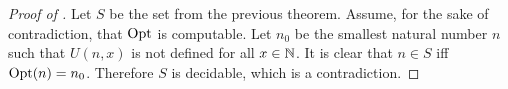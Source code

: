 \begin{proof}[Proof of ]
  Let $S$ be the set from the previous theorem.
  Assume, for the sake of contradiction, that $\mathrm{Opt}$ is computable. Let
  $n_0$ be the smallest natural number $n$ such that $U(n, x)$ is not defined
  for all $x \in {\mathbb{N}}$. It is clear that $n \in S$ iff $\mathrm{Opt}(n) = n_0$.
  Therefore $S$ is decidable, which is a contradiction.
\end{proof}
